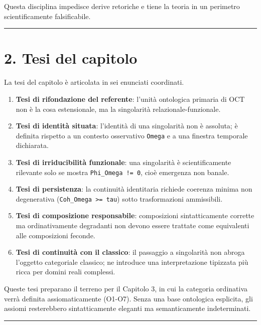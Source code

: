 Questa disciplina impedisce derive retoriche e tiene la teoria in un perimetro scientificamente falsificabile.

\begin{center}\rule{0.5\linewidth}{0.5pt}\end{center}

\section{2. Tesi del capitolo}

La tesi del capitolo è articolata in sei enunciati coordinati.

\begin{enumerate}
\def\labelenumi{\arabic{enumi}.}
\tightlist
\item
  \textbf{Tesi di rifondazione del referente}: l'unità ontologica primaria di OCT non è la cosa estensionale, ma la singolarità relazionale-funzionale.
\item
  \textbf{Tesi di identità situata}: l'identità di una singolarità non è assoluta; è definita rispetto a un contesto osservativo \texttt{Omega} e a una finestra temporale dichiarata.
\item
  \textbf{Tesi di irriducibilità funzionale}: una singolarità è scientificamente rilevante solo se mostra \texttt{Phi\_Omega\ !=\ 0}, cioè emergenza non banale.
\item
  \textbf{Tesi di persistenza}: la continuità identitaria richiede coerenza minima non degenerativa (\texttt{Coh\_Omega\ \textgreater{}=\ tau}) sotto trasformazioni ammissibili.
\item
  \textbf{Tesi di composizione responsabile}: composizioni sintatticamente corrette ma ordinativamente degradanti non devono essere trattate come equivalenti alle composizioni feconde.
\item
  \textbf{Tesi di continuità con il classico}: il passaggio a singolarità non abroga l'oggetto categoriale classico; ne introduce una interpretazione tipizzata più ricca per domini reali complessi.
\end{enumerate}

Queste tesi preparano il terreno per il Capitolo 3, in cui la categoria ordinativa verrà definita assiomaticamente (O1-O7). Senza una base ontologica esplicita, gli assiomi resterebbero sintatticamente eleganti ma semanticamente indeterminati.

\begin{center}\rule{0.5\linewidth}{0.5pt}\end{center}

